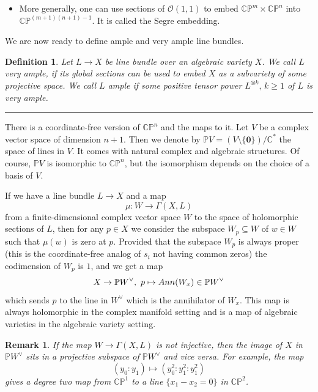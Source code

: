 \documentclass[11pt]{article}
\numberwithin{equation}{section}
\numberwithin{footnote}{section}
\newtheorem{defn}[thm]{Definition}
\newtheorem{rem}[thm]{Remark}
\newcommand{\blue}{\color{blue}}
\newcommand{\red}{\color{red}}
\renewcommand{\P}{{\mathbb P}}
\newcommand{\R}{{\mathbb R}}
\newcommand{\C}{{\mathbb C}}
\begin{document}
\begin{itemize}
We can see these two rulings on a {\blue real} quadric in the case of the hyperboloid of one sheet. It can be obtained by rotating a line around the axis, and this provides one of the rulings. There are also such rulings on the hyperbolic paraboloid -- these surfaces are projectively the same after compactification in $\R\P^3$.

\item
More generally, one can use sections of $\mathcal O(1,1)$ to embed $\C\P^m\times \C\P^n$ into $\C\P^{(m+1)(n+1)-1}$. It is called the Segre embedding. 

\end{itemize}

We are now ready to define {\blue ample} and {\blue very ample} line bundles.

\smallskip
\begin{defn}\label{ample}
Let $L\to X$ be line bundle over an algebraic variety $X$. We call $L$ very ample, if its global sections can be used to embed $X$ as a subvariety of some projective space. We call $L$ ample if some positive tensor power $L^{\otimes k},\,k\geq 1$ of $L$ is very ample.
\end{defn}


\smallskip
{\blue \hrule}


\smallskip
There is a coordinate-free version of  $\C\P^n$ and the maps to it. Let $V$ be a complex vector space of dimension $n+1$. Then we denote by $\P V = (V\setminus\{{\mathbf 0}\})/\C^*$ the space of lines in $V$. It comes with natural complex and algebraic structures. 
Of course, $\P V$ is isomorphic to $\C\P^n$, but the isomorphism depends on the choice of a basis of $V$. 

\smallskip
If we have a line bundle $L\to X$ and a map 
$$
\mu:W\to \Gamma(X,L)
$$
from a finite-dimensional complex vector space $W$ to the space of holomorphic sections of $L$, then for any $p\in X$ we consider the subspace $W_p\subseteq W$ 
of $w\in W$ such that $\mu(w)$ is zero at $p$. {\red Provided that the subspace $W_p$ is always proper} (this is the coordinate-free analog of $s_i$ not having common zeros) the codimension of $W_p$ is $1$, and we get a map 
$$
X\to \P W^\vee,~p\mapsto {\rm Ann}(W_x)\in \P W^\vee
$$
which sends $p$ to the line in $W^\vee$ which is the annihilator of $W_x$. This map is always holomorphic in the complex manifold setting and is a map of algebraic varieties in the algebraic variety setting.

\smallskip
\begin{rem}
If the map $W\to \Gamma(X,L)$ is not injective, then the image of $X$ in $\P W^{\vee}$ sits in a projective subspace of $\P W^{\vee}$ and vice versa. For example, the map
$$
(y_0:y_1)\mapsto (y_0^2:y_1^2:y_1^2)
$$
gives a degree two map from $\C\P^1$ to a line $\{x_1-x_2=0\}$ in $\C\P^2$.
\end{rem}
\end{document}
